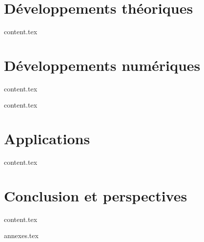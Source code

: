 \documentclass{bredele}
\begin{document}
\part{Développements théoriques}

\clearemptydoublepage
{content.tex}

\part{Développements numériques}

\clearemptydoublepage
{content.tex}


\clearemptydoublepage
{content.tex}

\part{Applications}

\clearemptydoublepage
{content.tex}


\part{Conclusion et perspectives}


\clearemptydoublepage
{content.tex}



\frontmatter
\clearemptydoublepage
{annexes.tex}



\clearemptydoublepage
\backmatter
\printbibliography

\tikzexternaldisable
\end{document}
